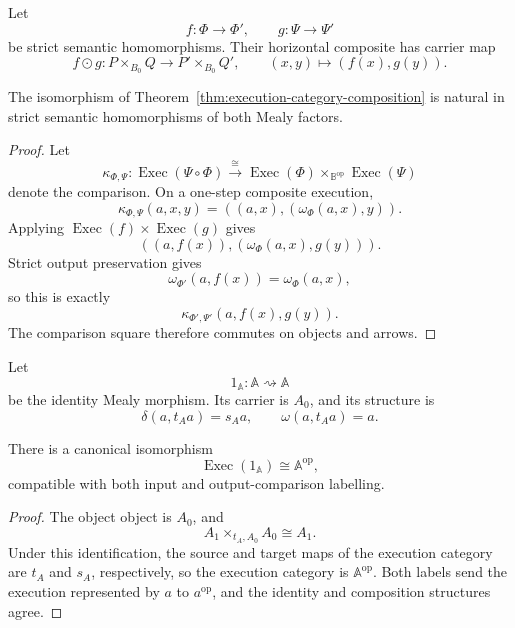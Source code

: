 Let
\[
    f:\Phi\to\Phi',
    \qquad
    g:\Psi\to\Psi'
\]
be strict semantic homomorphisms. Their horizontal composite has carrier map
\[
    f\odot g:
    P\times_{B_0}Q
    \longrightarrow
    P'\times_{B_0}Q',
    \qquad
    (x,y)\longmapsto(f(x),g(y)).
\]

\begin{proposition}
\label{prop:naturality-execution-composition}
The isomorphism of
Theorem~\ref{thm:execution-category-composition}
is natural in strict semantic homomorphisms of both Mealy factors.
\end{proposition}

\begin{proof}
Let
\[
    \kappa_{\Phi,\Psi}:
    \operatorname{Exec}(\Psi\circ\Phi)
    \xrightarrow{\cong}
    \operatorname{Exec}(\Phi)
    \times_{\mathbb B^{\mathrm{op}}}
    \operatorname{Exec}(\Psi)
\]
denote the comparison. On a one-step composite execution,
\[
    \kappa_{\Phi,\Psi}(a,x,y)
    =
    \left(
        (a,x),
        (\omega_\Phi(a,x),y)
    \right).
\]
Applying
\(\operatorname{Exec}(f)\times\operatorname{Exec}(g)\) gives
\[
    \left(
        (a,f(x)),
        (\omega_\Phi(a,x),g(y))
    \right).
\]
Strict output preservation gives
\[
    \omega_{\Phi'}(a,f(x))
    =
    \omega_\Phi(a,x),
\]
so this is exactly
\[
    \kappa_{\Phi',\Psi'}(a,f(x),g(y)).
\]
The comparison square therefore commutes on objects and arrows.
\end{proof}

Let
\[
    1_{\mathbb A}:
    \mathbb A\rightsquigarrow\mathbb A
\]
be the identity Mealy morphism. Its carrier is \(A_0\), and its structure is
\[
    \delta(a,t_Aa)=s_Aa,
    \qquad
    \omega(a,t_Aa)=a.
\]

\begin{proposition}
\label{prop:temporal-unit}
There is a canonical isomorphism
\[
    \operatorname{Exec}(1_{\mathbb A})
    \cong
    \mathbb A^{\mathrm{op}},
\]
compatible with both input and output-comparison labelling.
\end{proposition}

\begin{proof}
The object object is \(A_0\), and
\[
    A_1\times_{t_A,A_0}A_0
    \cong
    A_1.
\]
Under this identification, the source and target maps of the execution
category are \(t_A\) and \(s_A\), respectively, so the execution category is
\(\mathbb A^{\mathrm{op}}\). Both labels send the execution represented by
\(a\) to \(a^{\mathrm{op}}\), and the identity and composition structures
agree.
\end{proof}

